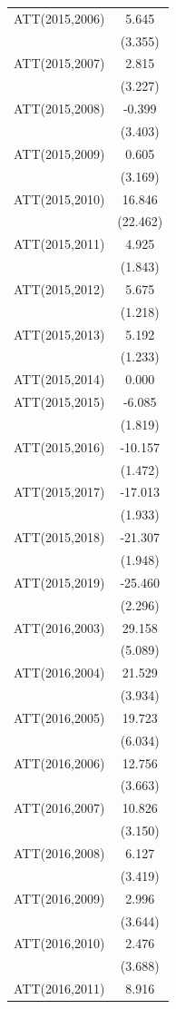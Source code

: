 \documentclass[
  12pt,
]{article}
\begin{document}
\begin{table}
\begin{tabular}[t]{lc}
ATT(2015,2006) & 5.645\\
 & (3.355)\\
ATT(2015,2007) & 2.815\\
 & (3.227)\\
ATT(2015,2008) & -0.399\\
 & (3.403)\\
ATT(2015,2009) & 0.605\\
 & (3.169)\\
ATT(2015,2010) & 16.846\\
 & (22.462)\\
ATT(2015,2011) & 4.925\\
 & (1.843)\\
ATT(2015,2012) & 5.675\\
 & (1.218)\\
ATT(2015,2013) & 5.192\\
 & (1.233)\\
ATT(2015,2014) & 0.000\\
ATT(2015,2015) & -6.085\\
 & (1.819)\\
ATT(2015,2016) & -10.157\\
 & (1.472)\\
ATT(2015,2017) & -17.013\\
 & (1.933)\\
ATT(2015,2018) & -21.307\\
 & (1.948)\\
ATT(2015,2019) & -25.460\\
 & (2.296)\\
ATT(2016,2003) & 29.158\\
 & (5.089)\\
ATT(2016,2004) & 21.529\\
 & (3.934)\\
ATT(2016,2005) & 19.723\\
 & (6.034)\\
ATT(2016,2006) & 12.756\\
 & (3.663)\\
ATT(2016,2007) & 10.826\\
 & (3.150)\\
ATT(2016,2008) & 6.127\\
 & (3.419)\\
ATT(2016,2009) & 2.996\\
 & (3.644)\\
ATT(2016,2010) & 2.476\\
 & (3.688)\\
ATT(2016,2011) & 8.916\\

\end{tabular}
\end{table}
\end{document}
